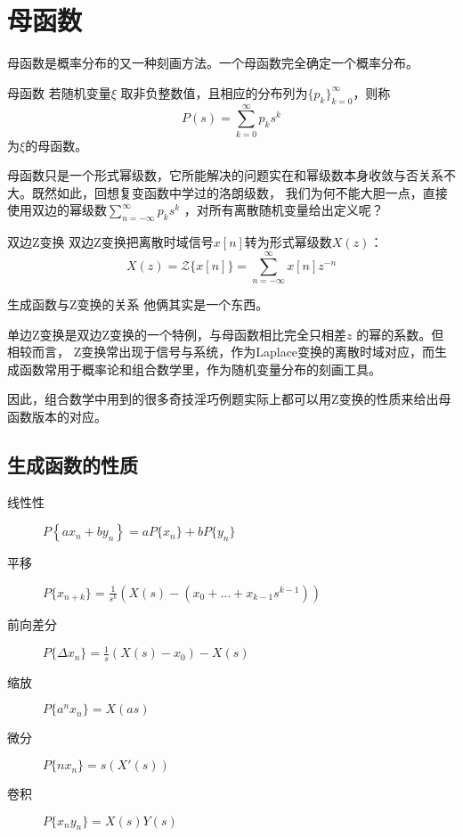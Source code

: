 \section{母函数}
母函数是概率分布的又一种刻画方法。一个母函数完全确定一个概率分布。
\begin{definition}{母函数}
    若随机变量\(\xi\) 取非负整数值，且相应的分布列为\(\{p_k\}_{k=0}^{\infty}\)，则称
    \[
        P(s) = \sum_{k=0}^{\infty} p_k s^{k}
    \]
    为\(\xi\)的母函数。
\end{definition}

母函数只是一个形式幂级数，它所能解决的问题实在和幂级数本身收敛与否关系不大。既然如此，回想复变函数中学过的洛朗级数，
我们为何不能大胆一点，直接使用双边的幂级数\(\sum_{n=-\infty}^{\infty} p_{k}s^{k}
\) ，对所有离散随机变量给出定义呢？

\begin{definition}{双边Z变换}
    双边Z变换把离散时域信号\(x[n]\)转为形式幂级数\(X(z)\)：
    \[
        X(z) = \mathcal{Z}\{x[n]\} =\sum_{n=-\infty}^{\infty}
        x[n] z^{-n}
    \]
\end{definition}

\begin{note}{生成函数与Z变换的关系}
    他俩其实是一个东西。

    单边Z变换是双边Z变换的一个特例，与母函数相比完全只相差\(z\) 的幂的系数。但相较而言，
    Z变换常出现于信号与系统，作为Laplace变换的离散时域对应，而生成函数常用于概率论和组合数学里，作为随机变量分布的刻画工具。

    因此，组合数学中用到的很多奇技淫巧例题实际上都可以用Z变换的性质来给出母函数版本的对应。
\end{note}

\subsection{生成函数的性质}

\begin{description}
    \item[线性性] \(P\left\{ a x_{n}+b y_{n} \right\} = a
        P\{x_{n}\} + b P\{y_{n}\}\)
    \item[平移] \(P\{x_{n+k}\} = \frac{1}{s^{k}}
            \left( X(s) -
        (x_{0} +\dots +x_{k-1}s^{k-1} ) \right)\)
    \item[前向差分] \(P\{\Delta x_{n}\} = \frac{1}{s} \left(
        X(s)-x_{0} \right)- X(s)\)
    \item[缩放] \(P\{a^{n} x_{n}\} = X(as)\)
    \item[微分] \(P\{n x_{n}\} = s(X'(s))\)
    \item[卷积] \(P\{x_{n}y_{n}\} = X(s)Y(s)\)
\end{description}
